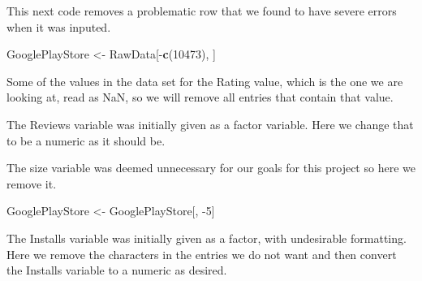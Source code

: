 \documentclass[]{article}
\newenvironment{Shaded}{\begin{snugshade}}{\end{snugshade}}
\newcommand{\KeywordTok}[1]{\textcolor[rgb]{0.13,0.29,0.53}{\textbf{{#1}}}}
\newcommand{\DecValTok}[1]{\textcolor[rgb]{0.00,0.00,0.81}{{#1}}}
\newcommand{\CharTok}[1]{\textcolor[rgb]{0.31,0.60,0.02}{{#1}}}
\newcommand{\StringTok}[1]{\textcolor[rgb]{0.31,0.60,0.02}{{#1}}}
\newcommand{\NormalTok}[1]{{#1}}
\begin{document}
This next code removes a problematic row that we found to have severe
errors when it was inputed.

\begin{Shaded}
\begin{Highlighting}[]
\NormalTok{GooglePlayStore <-}\StringTok{ }\NormalTok{RawData[-}\KeywordTok{c}\NormalTok{(}\DecValTok{10473}\NormalTok{), ]}
\end{Highlighting}
\end{Shaded}

Some of the values in the data set for the Rating value, which is the
one we are looking at, read as NaN, so we will remove all entries that
contain that value.

\begin{Shaded}
\end{Shaded}

The Reviews variable was initially given as a factor variable. Here we
change that to be a numeric as it should be.

\begin{Shaded}
\end{Shaded}

The size variable was deemed unnecessary for our goals for this project
so here we remove it.

\begin{Shaded}
\begin{Highlighting}[]
\NormalTok{GooglePlayStore <-}\StringTok{ }\NormalTok{GooglePlayStore[, -}\DecValTok{5}\NormalTok{]}
\end{Highlighting}
\end{Shaded}

The Installs variable was initially given as a factor, with undesirable
formatting. Here we remove the characters in the entries we do not want
and then convert the Installs variable to a numeric as desired.

\begin{Shaded}
\end{Shaded}
\end{document}
